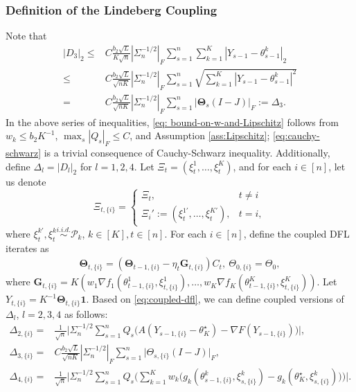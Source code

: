 \documentclass[a4paper,11pt]{article}
\numberwithin{equation}{section}
\theoremstyle{plain}
\theoremstyle{remark}
\def\bG{\mathbf{G}}
\def\bT{\mathbf{\Theta}}
\newcommand{\shift}[2]{#1_{#2, \{i\}}}
\newcommand{\minparam}{\theta^\star_K}
\begin{document}
\subsubsection{Definition of the Lindeberg Coupling} \label{se:coupling}
Note that 
\begin{align}
    |D_3|_2 \leq & C\frac{b_2\sqrt{L}}{K\sqrt{n}} |\Sigma_n^{-1/2}|_F \sum_{s=1}^n \sum_{k=1}^K |Y_{s-1} - \theta_{s-1}^k|_2 \label{eq: bound-on-w-and-Lipschitz}\\
    \leq & C\frac{b_2\sqrt{L}}{\sqrt{nK}}  |\Sigma_n^{-1/2}|_F \sum_{s=1}^n \sqrt{\sum_{k=1}^K |Y_{s-1}- \theta_{s-1}^k|^2} \label{eq:cauchy-schwarz} \\
    =& C\frac{b_2\sqrt{L}}{\sqrt{nK}}  |\Sigma_n^{-1/2}|_F \sum_{s=1}^n |\bT_s(I-J)|_F := \Delta_3.\label{eq:define delta_3}
\end{align}
In the above series of inequalities, \eqref{eq: bound-on-w-and-Lipschitz} follows from $w_k \leq b_2K^{-1}$, $\max_s |Q_s|_F \leq C$, and Assumption \ref{ass:Lipschitz}; \eqref{eq:cauchy-schwarz} is a trivial consequence of Cauchy-Schwarz inequality. Additionally, define $\Delta_l=|D_l|_2$ for $l=1,2,4$. Let $\Xi_t=(\xi_t^1, \ldots, \xi_t^K)$, and for each $i \in [n]$, let us denote $$\shift{\Xi}{t}=\begin{cases}
    \Xi_t, &t\neq i \\
    \Xi_i':=(\xi_t^{1'}, \ldots, \xi_t^{K'}), & t=i,
\end{cases}$$
where $\xi_t^{k'}, \xi_t^k \overset{i.i.d.}{\sim}\mathcal{P}_k$, $k \in [K], t \in [n]$. For each $i \in [n]$, define the coupled DFL iterates as
\begin{align}\label{eq:coupled-dfl}
\shift{\bT}{t} = (\shift{\bT}{t-1}- \eta_t \shift{\bG}{t})C_t , \ \shift{\Theta}{0}=\Theta_0 ,  
\end{align}
where $\shift{\bG}{t}=K(w_1 \nabla f_1(\shift{\theta}{t-1}^1, \shift{\xi}{t}^1), \ldots, w_K \nabla f_K(\shift{\theta}{t-1}^K, \shift{\xi}{t}^K))$. Let $\shift{Y}{t} =K^{-1}\shift{\bT}{t}\mathbf{1}$. Based on \eqref{eq:coupled-dfl}, we can define coupled versions of $\Delta_l$, $l=2,3,4$ as follows:
\begin{align}
    \shift{\Delta}{2}=&\frac{1}{\sqrt{n}}\bigg|\Sigma_n^{-1/2}\sum_{s=1}^n Q_s\big(A(\shift{Y}{s-1} - \minparam)  - \nabla F(\shift{Y}{s-1})\big)\bigg|, \label{eq:D2-shift-def}\\
    \shift{\Delta}{3}=& C\frac{b_2\sqrt{L}}{\sqrt{nK}} |\Sigma_n^{-1/2}|_F\sum_{s=1}^n  \big|\shift{\Theta}{s}(I-J )\big|_F, \label{eq:D3-shift-def}\\
    \shift{\Delta}{4} =& \frac{1}{\sqrt{n}} \bigg| \Sigma_n^{-1/2}\sum_{s=1}^n Q_s \Big( \sum_{k=1}^K w_k \big(g_k(\shift{\theta}{s-1}^k, \shift{\xi}{s}^k)-g_k(\minparam, \shift{\xi}{s}^k) \big) \Big) \bigg|. \label{eq:D4-shift-def}
\end{align}
\end{document}

